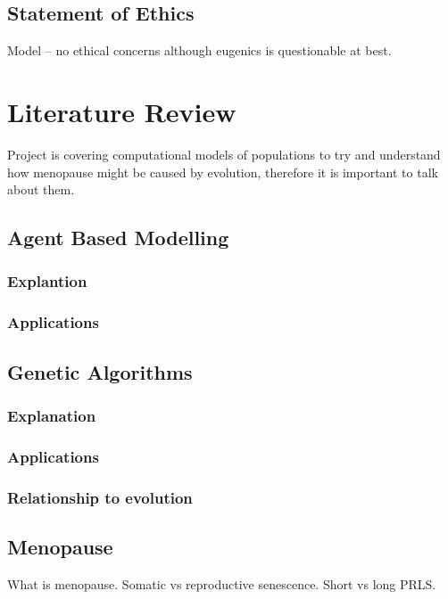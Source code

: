 \documentclass[authoryearcitations]{UoYCSproject}
\begin{document}
\section{Statement of Ethics}
Model -- no ethical concerns although eugenics is questionable at best.

\chapter{Literature Review}
\label{cha:Literature Review}
Project is covering computational models of populations to try and understand how menopause might be caused by evolution, therefore it is important to talk about them.

\section{Agent Based Modelling}

\subsection{Explantion}

\subsection{Applications}

\section{Genetic Algorithms}

\subsection{Explanation}

\subsection{Applications}

\subsection{Relationship to evolution}

\section{Menopause}
What is menopause. Somatic vs reproductive senescence. Short vs long PRLS.
\end{document}
